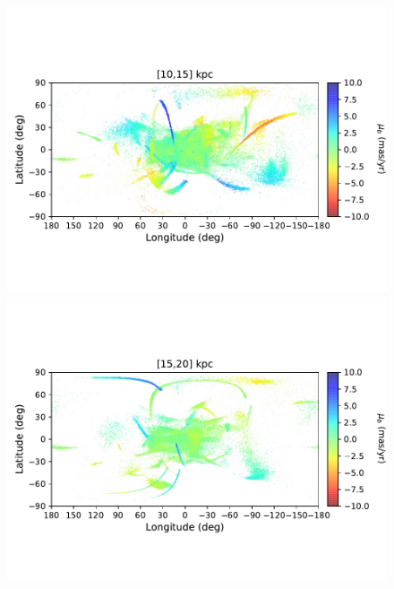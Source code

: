 \begin{figure}[h!]
\begin{center}
            \includegraphics[clip=true, trim = 0mm 20mm 0mm 20mm, width=0.9\columnwidth]{images/PII_ensemble_LB_D10-15_PMB_new.pdf}
            \includegraphics[clip=true, trim = 0mm 20mm 0mm 20mm, width=0.9\columnwidth]{images/PII_ensemble_LB_D15-20_PMB_new.pdf}


\end{center}
\end{figure}
